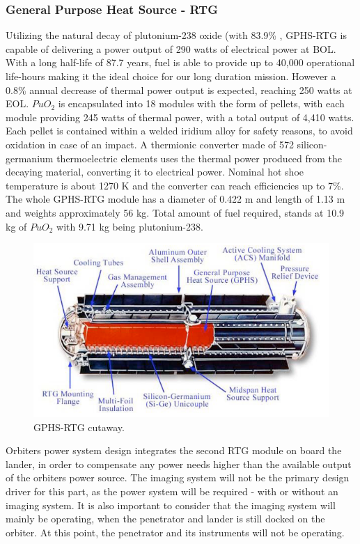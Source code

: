\subsubsection*{General Purpose Heat Source - RTG} 
Utilizing the natural decay of plutonium-238 oxide (with 83.9\% , GPHS-RTG is capable of delivering a power output of 290 watts of electrical power at BOL. With a long half-life of 87.7 years, fuel is able to provide up to 40,000 operational life-hours making it the ideal choice for our long duration mission. However a 0.8\% annual decrease of thermal power output is expected, reaching 250 watts at EOL. $PuO_2$ is encapsulated into 18 modules with the form of pellets, with each module providing 245 watts of thermal power, with a total output of 4,410 watts. Each pellet is contained within a welded iridium alloy for safety reasons, to avoid oxidation in case of an impact. A thermionic converter made of 572 silicon-germanium thermoelectric elements uses the thermal power produced from the decaying material, converting it to electrical power. Nominal hot shoe temperature is about 1270 K and the converter can reach efficiencies up to 7\%. The whole GPHS-RTG module has a diameter of 0.422 m and length of 1.13 m and weights approximately 56 kg. Total amount of fuel required, stands at 10.9 kg of $PuO_2$ with 9.71 kg being plutonium-238.
\begin{figure}[htb]
\centering
\includegraphics[scale=0.6]{figures/Orbiter/rtg.png}
\caption{GPHS-RTG cutaway. \cite{rtg}}
\label{fig:rtg}
\end{figure}
Orbiters power system design integrates the second RTG module on board the lander, in order to compensate any power needs higher than the available output of the orbiters power source. The imaging system will not be the primary design driver for this part, as the power system will be required - with or without an imaging system. It is also important to consider that the imaging system will mainly be operating, when the penetrator and lander is still docked on the orbiter. At this point, the penetrator and its instruments will not be operating.

